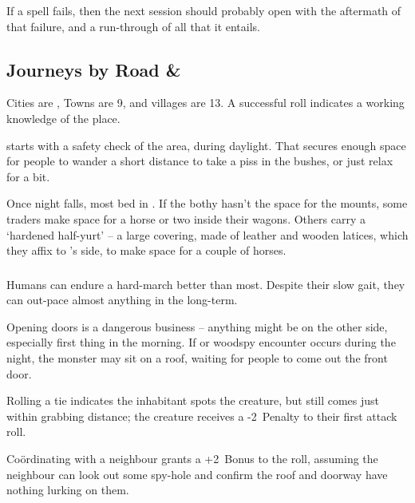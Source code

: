 \begin{multicols}{2}
{  If a spell fails, then the next session should probably open with the aftermath of that failure, and a run-through of all that it entails.
}{}

\subsection{Journeys by Road \& }

Cities are \tn[7], Towns are 9, and \glspl{village} are 13.
A successful roll indicates a working knowledge of the place.

%
starts with a safety check of the area, during daylight.
That secures enough space for people to wander a short distance to take a piss in the bushes, or just relax for a bit.

Once night falls, most bed in .
If the \gls{bothy} hasn't the space for the mounts, some traders make space for a horse or two inside their wagons.
Others carry a `hardened half-yurt' -- a large covering, made of leather and wooden latices, which they affix to 's side, to make space for a couple of horses.

\subsubsection{}

Humans can endure a hard-march better than most.
Despite their slow gait, they can out-pace almost anything in the long-term.%

Opening doors is a dangerous business -- anything might be on the other side, especially first thing in the morning.
If  or \gls{woodspy} encounter occurs during the night, the \gls{monster} may sit on a roof, waiting for people to come out the front door.

Rolling a tie indicates the inhabitant spots the creature, but still comes just within grabbing distance; the creature receives a -2~Penalty to their first attack roll.

Co\"ordinating with a neighbour grants a +2~Bonus to the roll, assuming the neighbour can look out some spy-hole and confirm the roof and doorway have nothing lurking on them.


\end{multicols}
